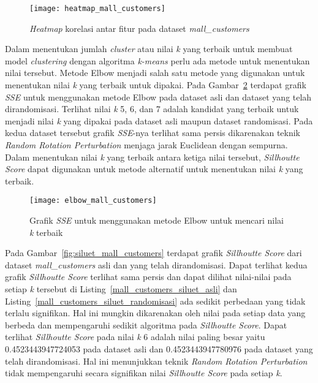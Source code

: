\begin{figure}
	\centering
	\texttt{[image: heatmap\_mall\_customers]}
	\caption{\textit{Heatmap} korelasi antar fitur pada dataset \textit{mall\_customers}}
	\label{fig:heatmap_mall_customers}
\end{figure}

Dalam menentukan jumlah \textit{cluster} atau nilai \textit{k} yang terbaik untuk membuat model \textit{clustering} dengan algoritma \textit{k-means} perlu ada metode untuk menentukan nilai tersebut. Metode Elbow menjadi salah satu metode yang digunakan untuk menentukan nilai \textit{k} yang terbaik untuk dipakai. Pada Gambar~\ref{fig:elbow_mall_customers} terdapat grafik \textit{SSE} untuk menggunakan metode Elbow pada dataset asli dan dataset yang telah dirandomisasi. Terlihat nilai \textit{k} 5, 6, dan 7 adalah kandidat yang terbaik untuk menjadi nilai \textit{k} yang dipakai pada dataset asli maupun dataset randomisasi. Pada kedua dataset tersebut grafik \textit{SSE}-nya terlihat sama persis dikarenakan teknik \textit{Random Rotation Perturbation} menjaga jarak Euclidean dengan sempurna. Dalam menentukan nilai \textit{k} yang terbaik antara ketiga nilai tersebut, \textit{Sillhoutte Score} dapat digunakan untuk metode alternatif untuk menentukan nilai \textit{k} yang terbaik.

\begin{figure}
	\centering
	\texttt{[image: elbow\_mall\_customers]}
	\caption{Grafik \textit{SSE} untuk menggunakan metode Elbow untuk mencari nilai \textit{k} terbaik}
	\label{fig:elbow_mall_customers}
\end{figure}

Pada Gambar~\ref{fig:siluet_mall_customers} terdapat grafik \textit{Sillhoutte Score} dari dataset \textit{mall\_customers} asli dan yang telah dirandomisasi. Dapat terlihat kedua grafik \textit{Sillhoutte Score} terlihat sama persis dan dapat dilihat nilai-nilai pada setiap \textit{k} tersebut di Listing~\ref{mall_customers_siluet_asli} dan Listing~\ref{mall_customers_siluet_randomisasi} ada sedikit perbedaan yang tidak terlalu signifikan. Hal ini mungkin dikarenakan oleh nilai pada setiap data yang berbeda dan mempengaruhi sedikit algoritma pada \textit{Sillhoutte Score}. Dapat terlihat \textit{Sillhoutte Score} pada nilai \textit{k} 6 adalah nilai paling besar yaitu 0.4523443947724053 pada dataset asli dan 0.4523443947780976 pada dataset yang telah dirandomisasi. Hal ini menunjukkan teknik \textit{Random Rotation Perturbation} tidak mempengaruhi secara signifikan nilai \textit{Sillhoutte Score} pada setiap \textit{k}.

